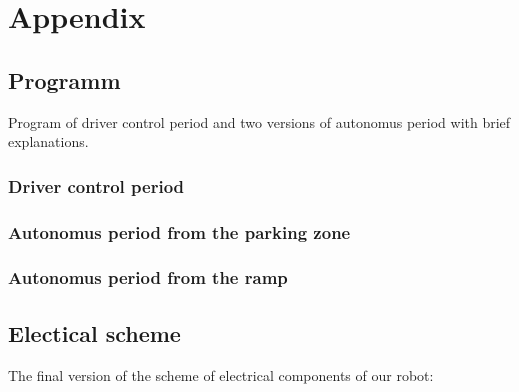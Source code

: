 \section{Appendix}



\subsection{Programm}

Program of driver control period and two versions of autonomus period with brief explanations.
\subsubsection{Driver control period}

\subsubsection{Autonomus period from the parking zone}



\subsubsection{Autonomus period from the ramp}


\subsection{Electical scheme}
The final version of the scheme of electrical components of our robot:
\begin{figure}[H]
	\begin{minipage}[h]{1\linewidth}
	\end{minipage}
\end{figure}
\fillpage